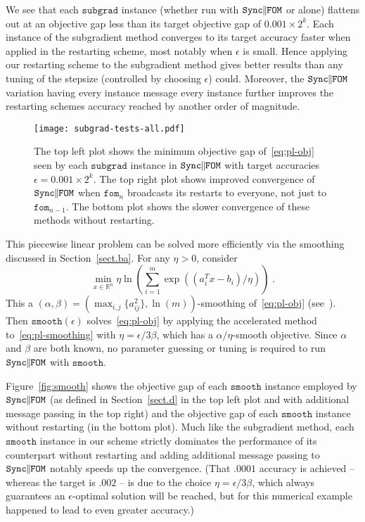 \documentclass[reqno, 11pt]{amsart}
\numberwithin{equation}{section}
\newcommand{\nt}{\negthinspace}
\newcommand{\fom}{\mathtt{fom}}
\newcommand{\parfom}{\parallel \nt \nt  \mathtt{FOM}}
\newcommand{\sparfom}{\mathtt{Sync} \nt \nt  \parfom}
\begin{document}
We see that each $\mathtt{subgrad}$ instance (whether run with $\sparfom$ or alone) flattens out at an objective gap less than its target objective gap of $0.001\times 2^k$. 
Each instance of the subgradient method converges to its target accuracy faster when applied in the restarting scheme, most notably when $\epsilon$ is small. Hence applying our restarting scheme to the subgradient method gives better results than any tuning of the stepsize (controlled by choosing $\epsilon$) could.
Moreover, the $\sparfom$ variation having every instance message every instance further improves the restarting schemes accuracy reached by another order of magnitude.

\begin{figure}
	\centering
	\texttt{[image: subgrad-tests-all.pdf]}
	
	\caption{The top left plot shows the minimum objective gap of~\eqref{eq:pl-obj} seen by each $\mathtt{subgrad}$ instance in $\sparfom$ with target accuracies $\epsilon=0.001\times 2^k$. The top right plot shows improved convergence of $\sparfom$ when $ \fom_n $ broadcasts its restarts to everyone, not just to $ \fom_{n-1} $. The bottom plot shows the slower convergence of these methods without restarting.} \label{fig:subgrad}
\end{figure}

This piecewise linear problem can be solved more efficiently via the smoothing discussed in Section~\ref{sect.ba}. For any $\eta>0$, consider
\begin{equation}\label{eq:pl-smoothing}
\min_{x\in\mathbb{R}^n} \eta \ln \left( \sum_{i=1}^m \exp ( (a_i^T x - b_i)/ \eta) \right)  \; .
\end{equation}
This a $(\alpha,\beta)=(\max_{i,j}\{a_{ij}^2\}, \ln (m)) $-smoothing of~\eqref{eq:pl-obj} (see~\cite{beck2012smoothing}).
Then $\mathtt{smooth}(\epsilon)$ solves~\eqref{eq:pl-obj} by applying the accelerated method to~\eqref{eq:pl-smoothing} with $\eta=\epsilon/3\beta$, which has a $\alpha/\eta$-smooth objective. Since $\alpha$ and $\beta$ are both known, no parameter guessing or tuning is required to run $\sparfom$ with $\mathtt{smooth}$.

Figure~\ref{fig:smooth} shows the objective gap of each $\mathtt{smooth}$ instance employed by $\sparfom$ (as defined in Section~\ref{sect.d} in the top left plot and with additional message passing in the top right) and the objective gap of each $\mathtt{smooth}$ instance without restarting (in the bottom plot). Much like the subgradient method, each $\mathtt{smooth}$ instance in our scheme strictly dominates the performance of its counterpart without restarting and adding additional message passing to $\sparfom$ notably speeds up the convergence. (That $ .0001 $ accuracy is achieved -- whereas the target is $ .002 $ -- is due to the choice $ \eta = \epsilon/3 \beta $, which always guarantees an $ \epsilon $-optimal solution will be reached, but for this numerical example happened to lead to even greater accuracy.)
\end{document}
